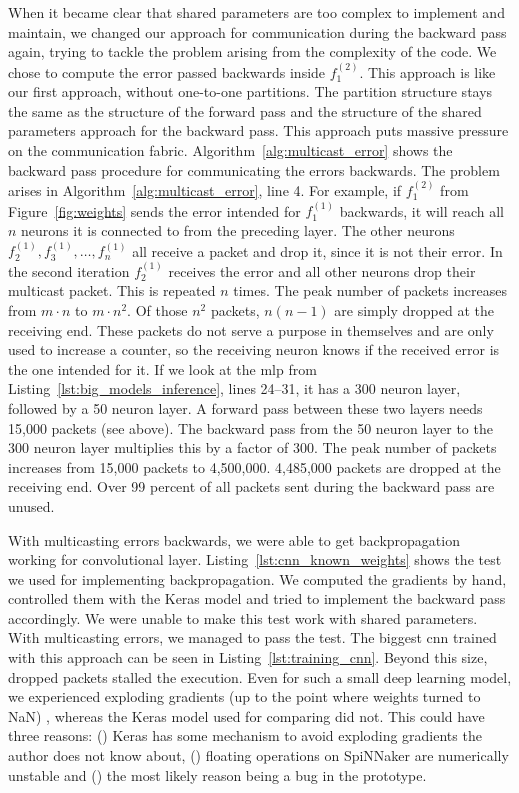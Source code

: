 \documentclass[]{article}
\begin{document}
When it became clear that shared parameters are too complex to
implement and maintain, we changed our approach for communication
during the backward pass again, trying to tackle the problem arising
from the complexity of the code.
We chose to compute the error passed backwards inside $f^{(2)}_1$.
This approach is like our first approach, without one-to-one
partitions.
The partition structure stays the same as the structure of the
forward pass and the structure of the shared parameters approach for
the backward pass.
This approach puts massive pressure on the communication fabric.
Algorithm~\ref{alg:multicast_error} shows the backward pass procedure
for communicating the errors backwards.
The problem arises in Algorithm~\ref{alg:multicast_error}, line 4.
For example, if $f^{(2)}_1$ from Figure~\ref{fig:weights} sends the
error intended for $f^{(1)}_1$ backwards, it will reach all $n$
neurons it is connected to from the preceding layer.
The other neurons $f^{(1)}_2, f^{(1)}_3, \dots, f^{(1)}_n$ all receive
a packet and drop it, since it is not their error.
In the second iteration $f^{(1)}_2$ receives the error and all other
neurons drop their multicast packet.
This is repeated $n$ times.
The peak number of packets increases from $m \cdot n$ to
$m \cdot n^2$.
Of those $n^2$ packets, $n(n - 1)$ are simply dropped at the receiving
end.
These packets do not serve a purpose in themselves and are only used
to increase a counter, so the receiving neuron knows if the received
error is the one intended for it.
If we look at the \acrshort{mlp} from Listing~\ref{lst:big_models_inference},
lines 24--31, it has a 300 neuron layer, followed by a 50 neuron
layer.
A forward pass between these two layers needs 15,000 packets
(see above).
The backward pass from the 50 neuron layer to the 300 neuron layer
multiplies this by a factor of 300.
The peak number of packets increases from 15,000 packets to 4,500,000.
4,485,000 packets are dropped at the receiving end.
Over 99 percent of all packets sent during the backward pass are
unused.

With multicasting errors backwards, we were able to get
backpropagation working for convolutional layer.
Listing~\ref{lst:cnn_known_weights} shows the test we used for
implementing backpropagation.
We computed the gradients by hand, controlled them with the Keras
model and tried to implement the backward pass accordingly.
We were unable to make this test work with shared parameters.
With multicasting errors, we managed to pass the test.
The biggest \acrshort{cnn} trained with this approach can be seen in
Listing~\ref{lst:training_cnn}.
Beyond this size, dropped packets stalled the execution.
Even for such a small deep learning model, we experienced exploding
gradients (up to the point where weights turned to NaN)
\citep{brownlee_2019a}, whereas the Keras model used for comparing
did not.
This could have three reasons: () Keras has some
mechanism to avoid exploding gradients the author does not know about,
() floating operations on SpiNNaker are numerically
unstable and () the most likely reason being a bug
in the prototype.
\end{document}
